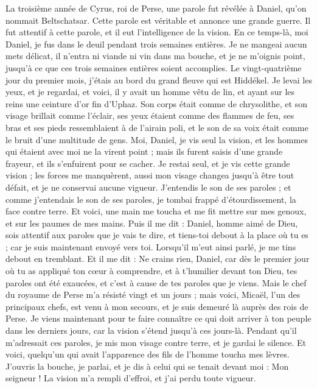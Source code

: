 \begin{multicols}{2}
\VerseOne{}La troisième année de Cyrus, roi de Perse, une parole fut révélée à Daniel, qu'on nommait Beltschatsar. Cette parole est véritable et annonce une grande guerre. Il fut attentif à cette parole, et il eut l'intelligence de la vision.
En ce temps-là, moi Daniel, je fus dans le deuil pendant trois semaines entières.
Je ne mangeai aucun mets délicat, il n'entra ni viande ni vin dans ma bouche, et je ne m'oignis point, jusqu'à ce que ces trois semaines entières soient accomplies.
Le vingt-quatrième jour du premier mois, j'étais au bord du grand fleuve qui est Hiddékel.
Je levai les yeux, et je regardai, et voici, il y avait un homme vêtu de lin, et ayant sur les reins une ceinture d'or fin d'Uphaz.
Son corps était comme de chrysolithe, et son visage brillait comme l'éclair, ses yeux étaient comme des flammes de feu, ses bras et ses pieds ressemblaient à de l'airain poli, et le son de sa voix était comme le bruit d'une multitude de gens.
Moi, Daniel, je vis seul la vision, et les hommes qui étaient avec moi ne la virent point ; mais ils furent saisis d'une grande frayeur, et ils s'enfuirent pour se cacher.
Je restai seul, et je vis cette grande vision ; les forces me manquèrent, aussi mon visage changea jusqu'à être tout défait, et je ne conservai aucune vigueur.
J'entendis le son de ses paroles ; et comme j'entendais le son de ses paroles, je tombai frappé d'étourdissement, la face contre terre.
Et voici, une main me toucha et me fit mettre sur mes genoux, et sur les paumes de mes mains.
Puis il me dit : Daniel, homme aimé de Dieu, sois attentif aux paroles que je vais te dire, et tiens-toi debout à la place où tu es ; car je suis maintenant envoyé vers toi. Lorsqu'il m'eut ainsi parlé, je me tins debout en tremblant.
Et il me dit : Ne crains rien, Daniel, car dès le premier jour où tu as appliqué ton cœur à comprendre, et à t'humilier devant ton Dieu, tes paroles ont été exaucées, et c'est à cause de tes paroles que je viens.
Mais le chef du royaume de Perse m'a résisté vingt et un jours ; mais voici, Micaël, l'un des principaux chefs, est venu à mon secours, et je suis demeuré là auprès des rois de Perse.
Je viens maintenant pour te faire connaître ce qui doit arriver à ton peuple dans les derniers jours, car la vision s'étend jusqu'à ces jours-là.
Pendant qu'il m'adressait ces paroles, je mis mon visage contre terre, et je gardai le silence.
Et voici, quelqu'un qui avait l'apparence des fils de l'homme toucha mes lèvres. J'ouvris la bouche, je parlai, et je dis à celui qui se tenait devant moi : Mon seigneur ! La vision m'a rempli d'effroi, et j'ai perdu toute vigueur.

\end{multicols}

